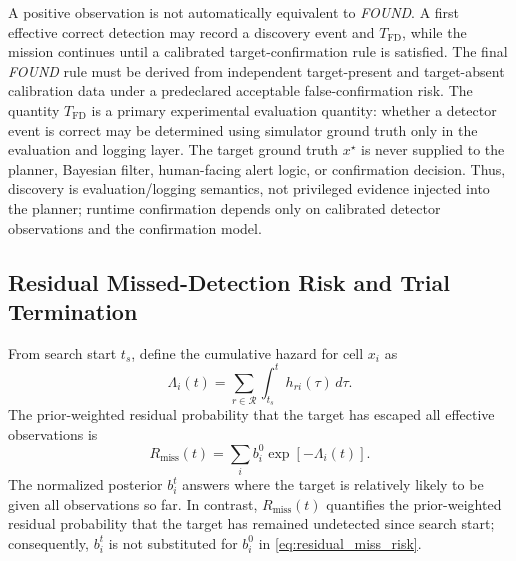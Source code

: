 \documentclass[letterpaper, 10pt, conference]{ieeeconf}
\begin{document}
A positive observation is not automatically equivalent to \emph{FOUND}. A first effective correct detection may record a discovery event and \(T_{\mathrm{FD}}\), while the mission continues until a calibrated target-confirmation rule is satisfied. The final \emph{FOUND} rule must be derived from independent target-present and target-absent calibration data under a predeclared acceptable false-confirmation risk. The quantity \(T_{\mathrm{FD}}\) is a primary experimental evaluation quantity: whether a detector event is correct may be determined using simulator ground truth only in the evaluation and logging layer. The target ground truth \(x^\star\) is never supplied to the planner, Bayesian filter, human-facing alert logic, or confirmation decision. Thus, discovery is evaluation/logging semantics, not privileged evidence injected into the planner; runtime confirmation depends only on calibrated detector observations and the confirmation model.

\subsection{Residual Missed-Detection Risk and Trial Termination}

From search start \(t_s\), define the cumulative hazard for cell \(x_i\) as
\begin{equation}
  \Lambda_i(t) =
  \sum_{r\in\mathcal{R}}\int_{t_s}^{t} h_{ri}(\tau)\,d\tau.
  \label{eq:cumulative_hazard}
\end{equation}
The prior-weighted residual probability that the target has escaped all effective observations is
\begin{equation}
  R_{\mathrm{miss}}(t) = \sum_i b_i^0\exp\!\left[-\Lambda_i(t)\right].
  \label{eq:residual_miss_risk}
\end{equation}
The normalized posterior \(b_i^t\) answers where the target is relatively likely to be given all observations so far. In contrast, \(R_{\mathrm{miss}}(t)\) quantifies the prior-weighted residual probability that the target has remained undetected since search start; consequently, \(b_i^t\) is not substituted for \(b_i^0\) in \eqref{eq:residual_miss_risk}.
\end{document}

